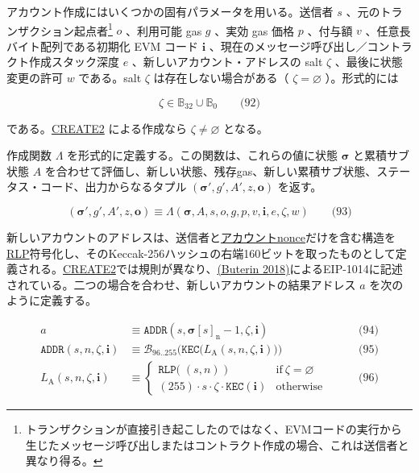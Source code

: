 \documentclass[
]{ltjsarticle}
\begin{document}
\hypertarget{endow}{}

アカウント作成にはいくつかの固有パラメータを用いる。送信者 \(s\)
、元のトランザクション起点者\footnote{トランザクションが直接引き起こしたのではなく、EVMコードの実行から生じたメッセージ呼び出しまたはコントラクト作成の場合、これは送信者と異なり得る。}
\(o\) 、利用可能 gas \(g\) 、実効 gas 価格 \(p\) 、付与額 \(v\)
、任意長バイト配列である初期化 EVM コード \(\mathbf{i}\)
、現在のメッセージ呼び出し／コントラクト作成スタック深度 \(e\)
、新しいアカウント・アドレスの salt \(\zeta\) 、最後に状態変更の許可
\(w\) である。salt \(\zeta\) は存在しない場合がある（
\(\zeta = \varnothing\) ）。形式的には

\protect\hypertarget{eq-92}{}{}

\[\zeta \in \mathbb{B}_{32} \cup \mathbb{B}_{0} \qquad \text{(92)}\]

である。\protect\hyperlink{create2}{CREATE2} による作成なら
\(\zeta \neq \varnothing\) となる。

作成関数 \(\Lambda\) を形式的に定義する。この関数は、これらの値に状態
\(\boldsymbol{\sigma}\) と累積サブ状態 \(A\)
を合わせて評価し、新しい状態、残存gas、新しい累積サブ状態、ステータス・コード、出力からなるタプル
\((\boldsymbol{\sigma}', g', A', z, \mathbf{o})\) を返す。

\protect\hypertarget{eq-93}{}{}

\[(\boldsymbol{\sigma}', g', A', z, \mathbf{o}) \equiv \Lambda(\boldsymbol{\sigma}, A, s, o, g, p, v, \mathbf{i}, e, \zeta, w) \qquad \text{(93)}\]

新しいアカウントのアドレスは、送信者と\protect\hyperlink{account_nonce}{アカウントnonce}だけを含む構造を\protect\hyperlink{rlp}{RLP}符号化し、そのKeccak-256ハッシュの右端160ビットを取ったものとして定義される。\protect\hyperlink{create2}{CREATE2}では規則が異なり、\protect\hyperlink{ref-EIP-1014}{(Buterin
2018)}によるEIP-1014に記述されている。二つの場合を合わせ、新しいアカウントの結果アドレス
\(a\) を次のように定義する。

\protect\hypertarget{eq-94}{}{}\protect\hypertarget{eq-95}{}{}\protect\hypertarget{eq-96}{}{}\protect\hypertarget{eq:new-address}{}{}

\[\begin{aligned}
a & \equiv \mathtt{ADDR}(s, \boldsymbol{\sigma}[s]_{\mathrm{n}} - 1, \zeta, \mathbf{i}) & \qquad \text{(94)} \\
\mathtt{ADDR}(s, n, \zeta, \mathbf{i}) & \equiv \mathcal{B}_{96..255}\Big(\mathtt{KEC}\big( L_{\mathrm{A}}(s, n, \zeta, \mathbf{i})\big) \Big) & \qquad \text{(95)} \\
L_{\mathrm{A}}(s, n, \zeta, \mathbf{i}) & \equiv \begin{cases}
\mathtt{RLP}\big(\;(s, n)\;\big) & \text{if}\ \zeta = \varnothing \\
(255) \cdot s \cdot \zeta \cdot \mathtt{KEC}(\mathbf{i}) & \text{otherwise}
\end{cases} & \qquad \text{(96)}
\end{aligned}\]
\end{document}
